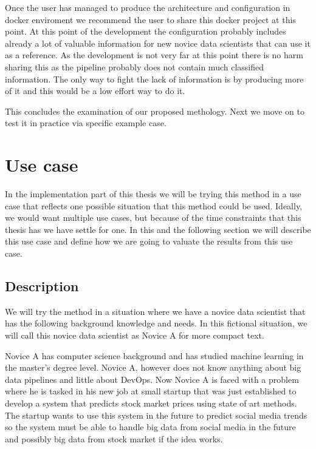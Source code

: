 Once the user has managed to produce the architecture and configuration in docker enviroment we recommend the user to share this docker project at this point.
At this point of the development the configuration probably includes already a lot of valuable information for new novice data scientists that can use it as a reference.
As the development is not very far at this point there is no harm sharing this as the pipeline probably does not contain much classified information.
The only way to fight the lack of information is by producing more of it and this would be a low effort way to do it.

This concludes the examination of our proposed methology. 
Next we move on to test it in practice via specific example case.

\section{Use case}

In the implementation part of this thesis we will be trying this method in a use case that reflects one possible situation that this method could be used.
Ideally, we would want multiple use cases, but because of the time constraints that this thesis has we have settle for one.
In this and the following section we will describe this use case and define how we are going to valuate the results from this use case.

\subsection{Description}

We will try the method in a situation where we have a novice data scientist that has the following background knowledge and needs.
In this fictional situation, we will call this novice data scientist as Novice A for more compact text.

Novice A has computer science background and has studied machine learning in the master's degree level.
Novice A, however does not know anything about big data pipelines and little about DevOps.
Now Novice A is faced with a problem where he is tasked in his new job at small startup that was just established to develop a system that predicts stock market prices using state of art methods.
The startup wants to use this system in the future to predict social media trends so the system must be able to handle big data from social media in the future and possibly big data from stock market if the idea works.

